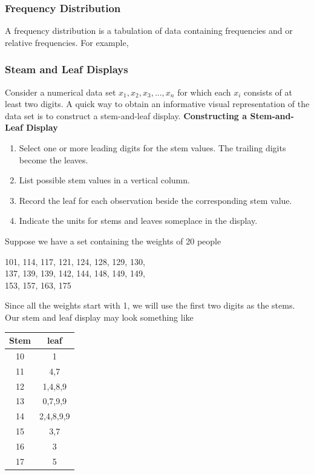 \documentclass{report}
\begin{document}
\pagebreak 
\subsubsection{Frequency Distribution}
\bigbreak \noindent 
A frequency distribution is a tabulation of data containing frequencies and or relative frequencies. For example,
\bigbreak \noindent 
{}


\pagebreak 
\subsubsection{Steam and Leaf Displays}
\bigbreak \noindent 
Consider a numerical data set $x_{1},x_{2},x_{3},...,x_{n}$ for which each $x_{i}$ consists of at least two
digits. A quick way to obtain an informative visual representation of the data set is
to construct a stem-and-leaf display.
\bigbreak \noindent 
\textbf{Constructing a Stem-and-Leaf Display}
\begin{enumerate}
    \item Select one or more leading digits for the stem values. The trailing digits become the leaves.
    \item List possible stem values in a vertical column.
    \item Record the leaf for each observation beside the corresponding stem value.
    \item Indicate the units for stems and leaves someplace in the display.
\end{enumerate}
\bigbreak \noindent 
Suppose we have a set containing the weights of 20 people
\bigbreak \noindent 
\begin{center}
    101, 114, 117, 121, 124, 128, 129, 130,  \\
    137, 139, 139, 142, 144, 148, 149, 149,  \\
    153, 157, 163, 175
\end{center}
\bigbreak \noindent 
Since all the weights start with 1, we will use the first two digits as the stems. Our stem and leaf display may look something like
\bigbreak \noindent 
\begin{center}
    \begin{tabular}{c|c}
        Stem & leaf \\
        \hline
        10 & 1\\
        11 & 4,7\\
        12 & 1,4,8,9\\ 
        13 & 0,7,9,9\\
        14 & 2,4,8,9,9\\
        15 &3,7\\
        16 &3\\
        17&5
    \end{tabular}
\end{center}
\end{document}

